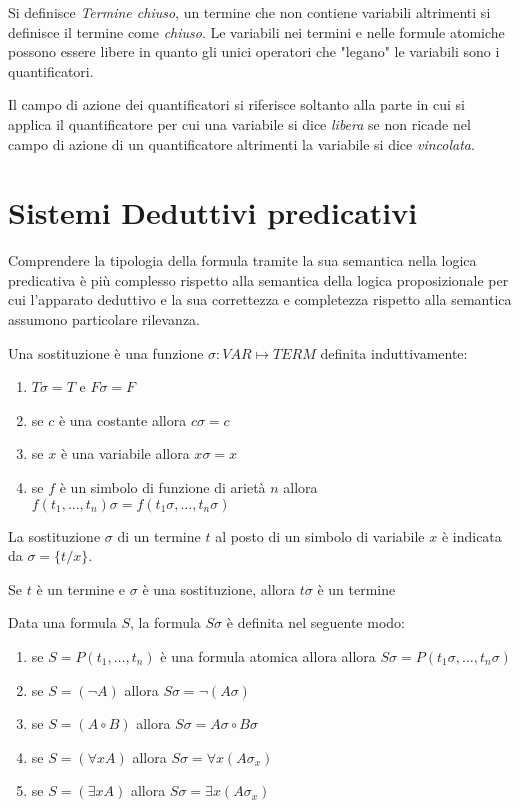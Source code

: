 Si definisce \emph{Termine chiuso}, un termine che non contiene variabili altrimenti
si definisce il termine come \emph{chiuso}.\newline
Le variabili nei termini e nelle formule atomiche possono essere libere
 in quanto gli unici operatori che "legano" le variabili sono i quantificatori.

Il campo di azione dei quantificatori si riferisce soltanto alla parte in cui
si applica il quantificatore per cui una variabile si dice \emph{libera}
se non ricade nel campo di azione di un quantificatore altrimenti la variabile si dice \emph{vincolata}.

\section{Sistemi Deduttivi predicativi}
Comprendere la tipologia della formula tramite la sua semantica nella logica predicativa
è più complesso rispetto alla semantica della logica proposizionale per cui l'apparato deduttivo
e la sua correttezza e completezza rispetto alla semantica assumono particolare rilevanza.

\begin{defi}
Una sostituzione è una funzione $\sigma:VAR \mapsto TERM$ definita induttivamente:
\end{defi}
\begin{enumerate}
    \item $T\sigma = T$ e $F \sigma = F$
    \item se $c$ è una costante allora $c \sigma = c$
    \item se $x$ è una variabile allora $x \sigma = x$
    \item se $f$ è un simbolo di funzione di arietà $n$ allora
          $f(t_1,\dots,t_n)\sigma = f(t_1\sigma,\dots,t_n\sigma)$
\end{enumerate}
La sostituzione $\sigma$ di un termine $t$ al posto di un simbolo di variabile $x$
è indicata da $\sigma = \{t/x \}$.

\begin{lem}
Se $t$ è un termine e $\sigma$ è una sostituzione, allora $t\sigma$ è un termine
\end{lem}

\begin{defi}
    Data una formula $S$, la formula $S\sigma$ è definita nel seguente modo:
\end{defi}
\begin{enumerate}
    \item se $S = P(t_1,\dots,t_n)$ è una formula atomica allora
          allora $S\sigma = P(t_1\sigma,\dots,t_n\sigma)$
    \item se $S = (\neg A)$ allora $S \sigma = \neg(A \sigma)$
    \item se $S = (A \circ B)$ allora $S \sigma = A\sigma \circ B \sigma$
    \item se $S = (\forall x A)$ allora $S \sigma = \forall x (A  \sigma _ x)$
    \item se $S = (\exists x A)$ allora $S \sigma = \exists x (A \sigma _ x)$
\end{enumerate}
